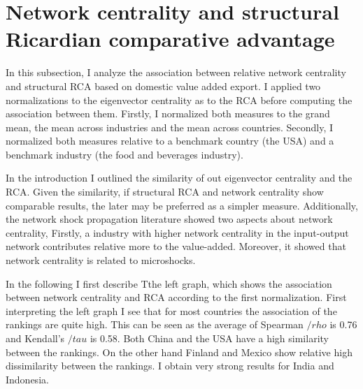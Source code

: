 \section{Network centrality and structural Ricardian comparative advantage}
In this subsection, I analyze the association between relative network centrality and  structural RCA based on domestic value added export.
I applied two normalizations to the eigenvector centrality as to the RCA before computing the association between them.
Firstly, I normalized  both measures to the grand mean, the mean across industries and the mean across countries.
Secondly, I normalized both measures relative to a benchmark country (the USA) and a benchmark industry (the food and beverages industry). \par
In the introduction I  outlined the similarity of out eigenvector centrality and the RCA.
Given the similarity, if structural RCA and network centrality show comparable results, the later may be preferred as a simpler measure.
Additionally, the network shock propagation literature showed two aspects about network centrality,
Firstly, a industry with higher network centrality in the input-output network contributes relative more to the value-added.
 Moreover, it showed that network centrality is related to microshocks.
  \par
In the following I first describe Tthe left graph, which shows the association between network centrality and RCA according to the first normalization.
First interpreting the left graph I see that for most countries the association of the rankings are quite high.
This can be seen as the average of Spearman $/rho$ is  0.76 and Kendall's  $/tau$ is 0.58.
Both China and the USA have a high similarity between the rankings.
On the other hand Finland and Mexico show relative high dissimilarity between the rankings.
I obtain very strong results for India and Indonesia.
